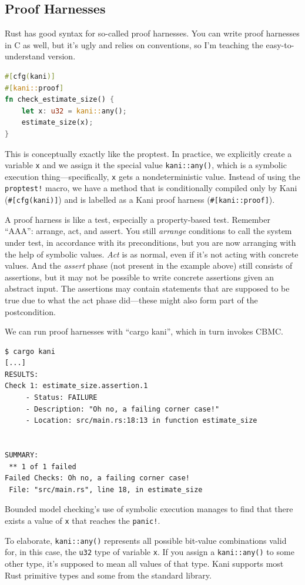 \documentclass[11pt]{article}
\begin{document}
\subsection*{Proof Harnesses}
Rust has good syntax for so-called proof harnesses. You can write proof harnesses in C as well,
but it's ugly and relies on conventions, so I'm teaching the easy-to-understand version.
\begin{lstlisting}[language=Rust]
#[cfg(kani)]
#[kani::proof]
fn check_estimate_size() {
    let x: u32 = kani::any();
    estimate_size(x);
}
\end{lstlisting}
This is conceptually exactly like the proptest. In practice, we explicitly create a variable \texttt{x} and
we assign it the special value \texttt{kani::any()}, which is a symbolic execution thing---specifically,
\texttt{x} gets a nondeterministic value. Instead of using the
\texttt{proptest!} macro, we have a method that is conditionally compiled only by Kani (\texttt{\#[cfg(kani)]})
and is labelled as a Kani proof harness (\texttt{\#[kani::proof]}). 

A proof harness is like a test, especially a property-based test. Remember ``AAA'': arrange, act,
and assert. You still \emph{arrange} conditions to call the system under test, in accordance with its
preconditions, but you are now arranging with the help of symbolic values. \emph{Act} is as normal,
even if it's not acting with concrete values. And the \emph{assert} phase (not present in the example above)
still consists of assertions, but it may not be possible to write concrete assertions given an abstract input.
The assertions may contain statements that are supposed to be true due to what the act phase did---these
might also form part of the postcondition.

We can run proof harnesses with ``cargo kani'', which in turn invokes CBMC.
{\scriptsize
\begin{verbatim}
$ cargo kani
[...]
RESULTS:
Check 1: estimate_size.assertion.1
	 - Status: FAILURE
	 - Description: "Oh no, a failing corner case!"
	 - Location: src/main.rs:18:13 in function estimate_size


SUMMARY:
 ** 1 of 1 failed
Failed Checks: Oh no, a failing corner case!
 File: "src/main.rs", line 18, in estimate_size
\end{verbatim}
}
Bounded model checking's use of symbolic execution manages to find that there exists a value of {\tt x}
that reaches the \texttt{panic!}.

To elaborate, \texttt{kani::any()} represents all possible bit-value combinations valid for, in this case, the
\texttt{u32} type of variable \texttt{x}. If you assign a \texttt{kani::any()} to some other type,
it's supposed to mean all values of that type. Kani supports most Rust primitive types and some from the
standard library.
\end{document}
